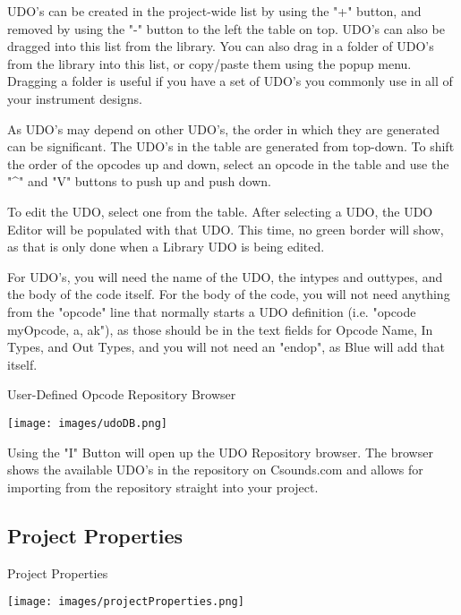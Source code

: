 UDO's can be created in the project-wide list by using the "+" button,
and removed by using the "-" button to the left the table on top. UDO's
can also be dragged into this list from the library. You can also drag
in a folder of UDO's from the library into this list, or copy/paste them
using the popup menu. Dragging a folder is useful if you have a set of
UDO's you commonly use in all of your instrument designs.

As UDO's may depend on other UDO's, the order in which they are
generated can be significant. The UDO's in the table are generated from
top-down. To shift the order of the opcodes up and down, select an
opcode in the table and use the "\^{}" and "V" buttons to push up and
push down.

To edit the UDO, select one from the table. After selecting a UDO, the
UDO Editor will be populated with that UDO. This time, no green border
will show, as that is only done when a Library UDO is being edited.

For UDO's, you will need the name of the UDO, the intypes and outtypes,
and the body of the code itself. For the body of the code, you will not
need anything from the "opcode" line that normally starts a UDO
definition (i.e. "opcode myOpcode, a, ak"), as those should be in the
text fields for Opcode Name, In Types, and Out Types, and you will not
need an "endop", as Blue will add that itself.

User-Defined Opcode Repository Browser

\texttt{[image: images/udoDB.png]}

Using the "I" Button will open up the UDO Repository browser. The
browser shows the available UDO's in the repository on Csounds.com and
allows for importing from the repository straight into your project.

\subsection{Project Properties}\label{projectProperties}

Project Properties

\texttt{[image: images/projectProperties.png]}


